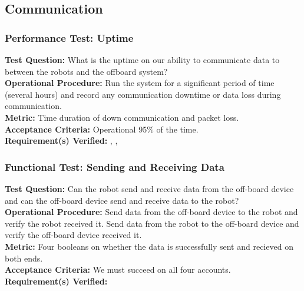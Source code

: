 
\subsection{Communication}
\label{sec:verification_comm}

\subsubsection{Performance Test: Uptime}
\label{test:comm_pt_reliability}
\textbf{Test Question:} What is the uptime on our ability to communicate data to between the robots and the offboard system?  \\
\textbf{Operational Procedure:} Run the system for a significant period of time (several hours) and record any communication downtime or data loss during communication. \\
\textbf{Metric:} Time duration of down communication and packet loss. \\
\textbf{Acceptance Criteria:} Operational 95\% of the time.\\
\textbf{Requirement(s) Verified:} , , 

\subsubsection{Functional Test: Sending and Receiving Data}
\label{test:comm_ft_send}
\textbf{Test Question:} Can the robot send and receive data from the off-board device and can the off-board device send and receive data to the robot?\\
\textbf{Operational Procedure:} Send data from the off-board device to the robot and verify the robot received it. Send data from the robot to the off-board device and verify the off-board device received it. \\
\textbf{Metric:} Four booleans on whether the data is successfully sent and recieved on both ends. \\
\textbf{Acceptance Criteria:} We must succeed on all four accounts. \\
\textbf{Requirement(s) Verified:} 

